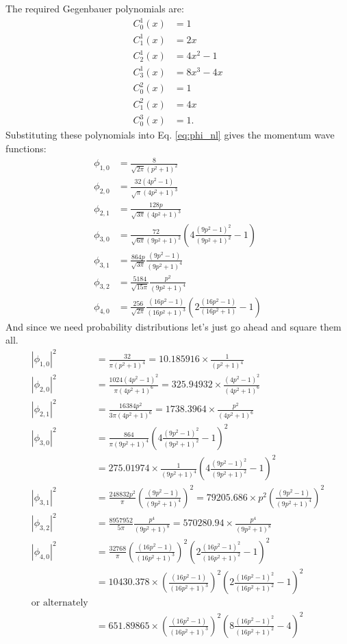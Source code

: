 \documentclass[12pt]{article}
\begin{document}
The required Gegenbauer polynomials are:
\begin{align*}
C^1_0(x)&=1\\
C^1_1(x)&=2x\\
C^1_2(x)&=4x^2-1\\
C^1_3(x)&=8x^3-4x\\
C^2_0(x)&=1\\
C^2_1(x)&=4x\\
C^3_0(x)&=1.
\end{align*}
Substituting these polynomials into Eq. \ref{eq:phi_nl} gives the momentum wave functions:
\begin{align}
\phi_{1,0}&=\frac{8}{\sqrt{2\pi}(p^2+1)^2}\\
\phi_{2,0}&=\frac{32(4p^2-1)}{\sqrt{\pi}(4p^2+1)^3}\\
\phi_{2,1}&=\frac{128p}{\sqrt{3\pi}(4p^2+1)^3}\\
\phi_{3,0}&=\frac{72}{\sqrt{6\pi}(9p^2+1)^2}\left(4\frac{(9p^2-1)^2}{(9p^2+1)^2}-1\right)\\
\phi_{3,1}&=\frac{864p}{\sqrt{3\pi}}\frac{(9p^2-1)}{(9p^2+1)^4}\\
\phi_{3,2}&=\frac{5184}{\sqrt{15\pi}}\frac{p^2}{(9p^2+1)^4}\\
\phi_{4,0}&=\frac{256}{\sqrt{2\pi}}\frac{(16p^2-1)}{(16p^2+1)^3}\left(2\frac{(16p^2-1)}{(16p^2+1)}-1\right)
\end{align}
And since we need probability distributions let's just go ahead and square them all.
\begin{align}
\left|\phi_{1,0}\right|^2&=\frac{32}{\pi(p^2+1)^4}=10.185916\times\frac{1}{(p^2+1)^4}\\
\left|\phi_{2,0}\right|^2&=\frac{1024(4p^2-1)^2}{\pi(4p^2+1)^6}=325.94932\times\frac{(4p^2-1)^2}{(4p^2+1)^6}\\
\left|\phi_{2,1}\right|^2&=\frac{16384p^2}{3\pi(4p^2+1)^6}=1738.3964\times\frac{p^2}{(4p^2+1)^6}\\
\left|\phi_{3,0}\right|^2&=\frac{864}{\pi(9p^2+1)^4}\left(4\frac{(9p^2-1)^2}{(9p^2+1)^2}-1\right)^2\\~&=275.01974\times\frac{1}{(9p^2+1)^4}\left(4\frac{(9p^2-1)^2}{(9p^2+1)^2}-1\right)^2\\
\left|\phi_{3,1}\right|^2&=\frac{248832p^2}{\pi}\left(\frac{(9p^2-1)}{(9p^2+1)^4}\right)^2=79205.686\times p^2\left(\frac{(9p^2-1)}{(9p^2+1)^4}\right)^2\\
\left|\phi_{3,2}\right|^2&=\frac{8957952}{5\pi}\frac{p^4}{(9p^2+1)^8}=570280.94\times\frac{p^4}{(9p^2+1)^8}\\
\left|\phi_{4,0}\right|^2&=\frac{32768}{\pi}\left(\frac{(16p^2-1)}{(16p^2+1)^3}\right)^2\left(2\frac{(16p^2-1)^2}{(16p^2+1)^2}-1\right)^2\\~&=10430.378\times\left(\frac{(16p^2-1)}{(16p^2+1)^3}\right)^2\left(2\frac{(16p^2-1)^2}{(16p^2+1)^2}-1\right)^2\\\textrm{or alternately}\\
~&=651.89865\times\left(\frac{(16p^2-1)}{(16p^2+1)^3}\right)^2\left(8\frac{(16p^2-1)^2}{(16p^2+1)^2}-4\right)^2
\end{align}
\end{document}
